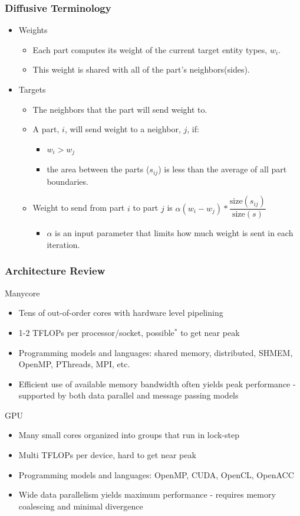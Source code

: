 \documentclass{beamer}
\begin{document}
\begin{frame}
  \frametitle{Diffusive Terminology}
  \begin{itemize}
  \item Weights
    \begin{itemize}
    \item Each part computes its weight of the current target entity types, $w_i$.
    \item This weight is shared with all of the part's neighbors(sides).
    \end{itemize}
  \item Targets
    \begin{itemize}
    \item The neighbors that the part will send weight to.
    \item A part, $i$, will send weight to a neighbor, $j$, if:
      \begin{itemize}
      \item $w_i>w_j$
      \item the area between the parts ($s_{ij}$) is less than the average of all part boundaries.  
      \end{itemize}
    \item Weight to send from part $i$ to part $j$ is $\alpha(w_i-w_j)*\dfrac{\text{size}(s_{ij})}{\text{size}(s)}$
      \begin{itemize}
        \item $\alpha$ is an input parameter that limits how much weight is sent in each iteration.
      \end{itemize}
    \end{itemize}
  \end{itemize}
\end{frame}

\begin{frame}
  \frametitle{Architecture Review}
  Manycore
  \begin{itemize}
    \item Tens of out-of-order cores with hardware level pipelining
    \item 1-2 TFLOPs per processor/socket, possible$^{*}$ to get near
      peak
    \item Programming models and languages: shared memory,
      distributed, SHMEM, OpenMP, PThreads, MPI, etc.
    \item Efficient use of available memory bandwidth often yields peak performance - 
      supported by both data parallel and message passing models
  \end{itemize}
  GPU
  \begin{itemize}
    \item Many small cores organized into groups that run in lock-step
    \item Multi TFLOPs per device, hard to get near peak
    \item Programming models and languages: OpenMP, CUDA, OpenCL,
      OpenACC
    \item Wide data parallelism yields maximum performance - requires memory
      coalescing and minimal divergence
  \end{itemize}
\end{frame}
\end{document}
